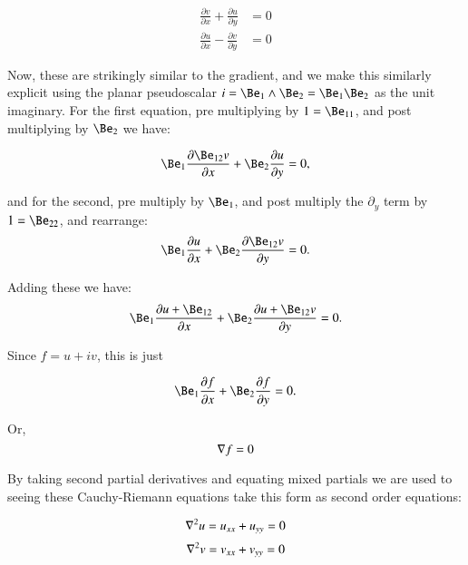 \begin{align}
\frac{\partial v}{\partial x} + \frac{\partial u}{\partial y} &= 0 \\
\frac{\partial u}{\partial x} - \frac{\partial v}{\partial y} &= 0
\end{align}

Now, these are strikingly similar to the gradient, and we make this similarly explicit using the planar
pseudoscalar
$i=\Be_1 \wedge \Be_2 = \Be_1 \Be_2$
as the unit imaginary.  For the first equation, pre multiplying by $1 = \Be_{11}$, and post multiplying by $\Be_2$ we have:

\begin{equation*}
\Be_1 \frac{\partial \Be_{12} v}{\partial x} + \Be_{2}\frac{\partial u}{\partial y} = 0,
\end{equation*}

and for the second, pre multiply by $\Be_1$, and post multiply the $\partial_y$ term by $1 = \Be_{22}$, and rearrange:
\begin{equation*}
\Be_1 \frac{\partial u}{\partial x} + \Be_{2} \frac{\partial \Be_{12} v}{\partial y} = 0.
\end{equation*}

Adding these we have:
\begin{equation*}
\Be_1 \frac{\partial u + \Be_{12}}{\partial x} + \Be_{2} \frac{\partial u + \Be_{12} v}{\partial y} = 0.
\end{equation*}

Since $f = u + i v$, this is just

\begin{equation}
\Be_1 \frac{\partial f}{\partial x} + \Be_{2} \frac{\partial f}{\partial y} = 0.
\end{equation}

Or,
\begin{equation}\label{eqn:cauchy_gradient:gradf}
\nabla f = 0
\end{equation}

By taking second partial derivatives and equating mixed partials we are used to seeing these Cauchy-Riemann equations
take this form as second order equations:

\begin{equation}\label{eqn:cauchy_gradient:uxx}
\nabla^2 u = u_{xx} + u_{yy} = 0
\end{equation}
\begin{equation}
\nabla^2 v = v_{xx} + v_{yy} = 0
\end{equation}

